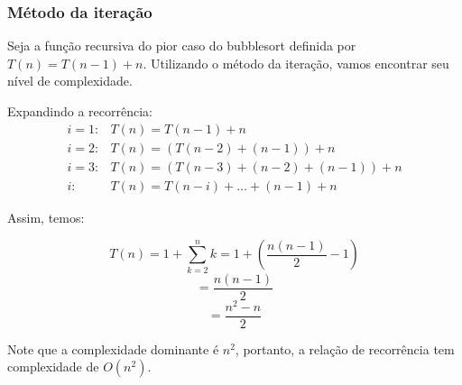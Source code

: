 \subsubsection{Método da iteração}
Seja a função recursiva do pior caso do bubblesort definida por \( T(n) = T(n-1) + n \). Utilizando o método da iteração, vamos encontrar seu nível de complexidade. 

Expandindo a recorrência:
\begin{align*}
i = 1 : &T(n) = T(n - 1) + n \\
i = 2 : &T(n) = (T(n - 2) + (n - 1)) + n \\
i = 3 : &T(n) = (T(n - 3) + (n - 2) + (n - 1)) + n \\
i : & T(n) = T(n - i) + \dots + (n - 1) + n
\end{align*}

Assim, temos:

\[
T(n) = 1 + \sum_{k=2}^{n} k = 1 + \left( \frac{n(n-1)}{2} - 1 \right)
\]
\[
= \frac{n(n-1)}{2}
\]
\[
= \frac{n^2 - n}{2}
\]

Note que a complexidade dominante é \( n^2 \), portanto, a relação de recorrência tem complexidade de \( O(n^2) \).

